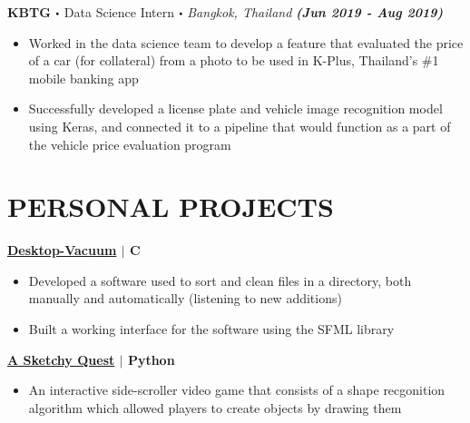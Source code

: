 \documentclass[10pt]{article}
\newcommand\sbullet[1][.5]{\mathbin{\vcenter{\hbox{\scalebox{#1}{$\bullet$}}}}}
\newcommand{\CC}{C\nolinebreak\hspace{-.05em}\raisebox{.4ex}{\tiny\bf +}\nolinebreak\hspace{-.10em}\raisebox{.4ex}{\tiny\bf +}}
\begin{document}
  \textbf{\large KBTG $\sbullet$} {\large Data Science Intern $\sbullet$ \textit{Bangkok, Thailand} \hfill \textit{\textbf{(Jun 2019 - Aug 2019)}}}

  \vspace*{-0.2cm}
  \begin{itemize}
    \itemsep-0.4em
    \item \textcolor{lighterG}{Worked in the data science team to develop a feature that evaluated the price of a car (for collateral) from a photo to be used in K-Plus, Thailand's \#1 mobile banking app}
    \item \textcolor{lighterG}{Successfully developed a license plate and vehicle image recognition model using Keras, and connected it to a pipeline that would function as a part of the vehicle price evaluation program}
  \end{itemize}

  \section*{\large \textcolor{lighterB}{PERSONAL PROJECTS}}
  \vspace*{-0.23cm}

  \textbf{\large \href{https://github.com/Piratach/desktop-vacuum}{Desktop-Vacuum} $\mid$ \CC} 
  \vspace*{-0.17cm}
  \begin{itemize}
    \itemsep-0.4em
    \item \textcolor{lighterG}{Developed a software used to sort and clean files in a directory, both manually and automatically (listening to new additions)}
    \item \textcolor{lighterG}{Built a working interface for the software using the SFML library}
  \end{itemize}

  \textbf{\large \href{https://github.com/Piratach/A-Sketchy-Quest}{A Sketchy Quest} $\mid$ Python} 
  \vspace*{-0.17cm}
  \begin{itemize}
    \itemsep-0.4em
    \item \textcolor{lighterG}{An interactive side-scroller video game that consists of a shape recgonition algorithm which allowed players to create objects by drawing them}
  \end{itemize}
\end{document}
